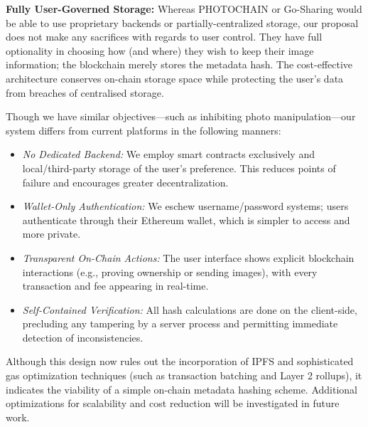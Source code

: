 \textbf{Fully User-Governed Storage:}
Whereas PHOTOCHAIN or Go-Sharing would be able to use proprietary backends or partially-centralized
storage, our proposal does not make any sacrifices with regards to user control. They have full
optionality in choosing how (and where) they wish to keep their image information; the blockchain
merely stores the metadata hash. The cost-effective architecture conserves on-chain storage space
while protecting the user's data from breaches of centralised storage.


Though we have similar objectives---such as inhibiting photo manipulation---our system differs from
current platforms in the following manners:

\begin{itemize}
  \item \emph{No Dedicated Backend:} We employ smart contracts exclusively and local/third-party
        storage of the user's preference. This reduces points of failure and encourages greater
        decentralization.
  \item \emph{Wallet-Only Authentication:} We eschew username/password systems; users authenticate
        through their Ethereum wallet, which is simpler to access and more private.
  \item \emph{Transparent On-Chain Actions:} The user interface shows explicit blockchain interactions
        (e.g., proving ownership or sending images), with every transaction and fee appearing in
        real-time.
  \item \emph{Self-Contained Verification:} All hash calculations are done on the client-side,
        precluding any tampering by a server process and permitting immediate detection of
        inconsistencies.
\end{itemize}

Although this design now rules out the incorporation of IPFS and sophisticated gas optimization
techniques (such as transaction batching and Layer 2 rollups), it indicates the viability of a
simple on-chain metadata hashing scheme. Additional optimizations for scalability and cost reduction
will be investigated in future work.